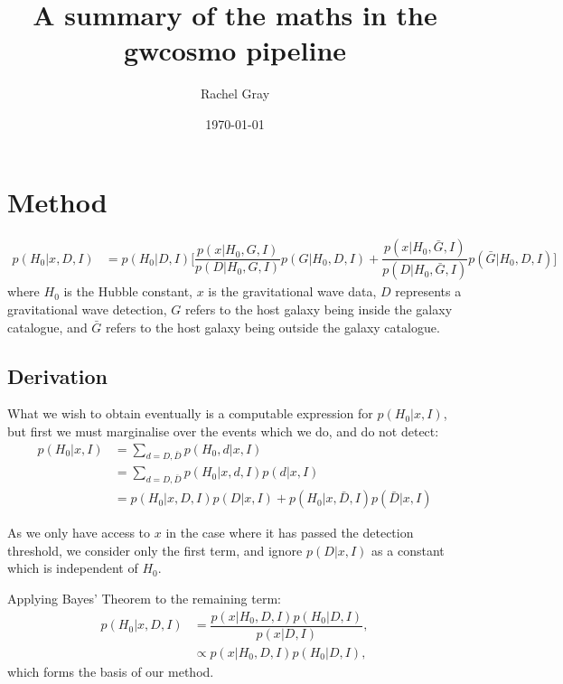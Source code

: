 \documentclass[a4paper,10pt]{article}
\title{A summary of the maths in the gwcosmo pipeline}
\author{Rachel Gray}
\date{\today} %
\begin{document}
\maketitle

\section{Method}
\begin{equation} \label{Eq:Master Equation}
\begin{aligned}
p(H_0|x,D,I) &= p(H_0|D,I) \bigg[ \dfrac{p(x|H_0,G,I)}{p(D|H_0,G,I)} p(G|H_0,D,I) + \dfrac{p(x|H_0,\bar{G},I)}{p(D|H_0,\bar{G},I)} p(\bar{G}|H_0,D,I) \bigg]
\end{aligned}
\end{equation}
where $H_0$ is the Hubble constant, $x$ is the gravitational wave data, $D$ represents a gravitational wave detection, $G$ refers to the host galaxy being inside the galaxy catalogue, and $\bar{G}$ refers to the host galaxy being outside the galaxy catalogue.

\subsection{Derivation} \label{sec:derivation}
What we wish to obtain eventually is a computable expression for $p(H_0|x,I)$, but first we must marginalise over the events which we do, and do not detect:
\begin{equation} \label{Eq:sum D}
\begin{aligned}
p(H_0|x,I) &= \sum_{d=D,\bar{D}} p(H_0,d|x,I)
\\ &= \sum_{d=D,\bar{D}} p(H_0|x,d,I) p(d|x,I)
\\ &= p(H_0|x,D,I) p(D|x,I) + p(H_0|x,\bar{D},I) p(\bar{D}|x,I)
\end{aligned} 
\end{equation}

As we only have access to $x$ in the case where it has passed the detection threshold, we consider only the first term, and ignore $p(D|x,I)$ as a constant which is independent of $H_0$.

Applying Bayes' Theorem to the remaining term:
\begin{equation} \label{Eq:posterior}
\begin{aligned}
p(H_0|x,D,I) &= \dfrac{p(x|H_0,D,I)p(H_0|D,I)}{p(x|D,I)},
\\ &\propto p(x|H_0,D,I)p(H_0|D,I),
\end{aligned} 
\end{equation}
which forms the basis of our method.
\end{document}
